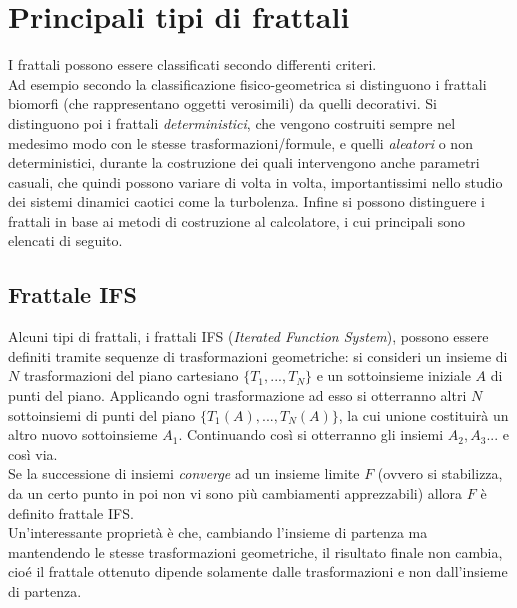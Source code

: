 \documentclass[10pt]{report}
\begin{document}
		\section{Principali tipi di frattali}
			I frattali possono essere classificati secondo differenti criteri.\\
			Ad esempio secondo la classificazione fisico-geometrica si distinguono i frattali biomorfi (che rappresentano oggetti verosimili) da quelli decorativi. Si distinguono poi i frattali \textit{deterministici}, che vengono costruiti sempre nel medesimo modo con le stesse trasformazioni/formule, e quelli \textit{aleatori} o non deterministici, durante la costruzione dei quali intervengono anche parametri casuali, che quindi possono variare di volta in volta, importantissimi nello studio dei sistemi dinamici caotici come la turbolenza.
			Infine si possono distinguere i frattali in base ai metodi di costruzione al calcolatore, i cui principali sono elencati di seguito.
			\subsection{Frattale IFS}
				Alcuni tipi di frattali, i frattali IFS (\textit{Iterated Function System}), possono essere definiti tramite sequenze di trasformazioni geometriche: si consideri un insieme di $N$ trasformazioni del piano cartesiano $\{T_1, ...,T_{N}\}$ e un sottoinsieme iniziale $A$ di punti del piano. Applicando ogni trasformazione ad esso si otterranno altri $N$ sottoinsiemi di punti del piano $\{T_1(A), ...,T_N(A)\}$, la cui unione costituirà un altro nuovo sottoinsieme $A_1$. Continuando così si otterranno gli insiemi $A_2, A_3...$ e così via.\\
				Se la successione di insiemi \textit{converge} ad un insieme limite $F$ (ovvero si stabilizza, da un certo punto in poi non vi sono più cambiamenti apprezzabili) allora $F$ è definito frattale IFS.\\
				Un'interessante proprietà è che, cambiando l'insieme di partenza ma mantendendo le stesse trasformazioni geometriche, il risultato finale non cambia, cioé il frattale ottenuto dipende solamente dalle trasformazioni e non dall'insieme di partenza.
			
\end{document}
